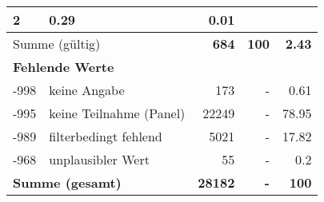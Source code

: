 \begin{longtable}{lXrrr}
       \num{2} &
       \num[round-mode=places,round-precision=2]{0.29} &
         \num[round-mode=places,round-precision=2]{0.01} \\
     \midrule
     \multicolumn{2}{l}{Summe (gültig)} &
       \textbf{\num{684}} &
     \textbf{\num{100}} &
       \textbf{\num[round-mode=places,round-precision=2]{2.43}} \\
     \multicolumn{5}{l}{\textbf{Fehlende Werte}}\\
       -998 &
       keine Angabe &
         \num{173} &
        - &
         \num[round-mode=places,round-precision=2]{0.61} \\
       -995 &
       keine Teilnahme (Panel) &
         \num{22249} &
        - &
         \num[round-mode=places,round-precision=2]{78.95} \\
       -989 &
       filterbedingt fehlend &
         \num{5021} &
        - &
         \num[round-mode=places,round-precision=2]{17.82} \\
       -968 &
       unplausibler Wert &
         \num{55} &
        - &
         \num[round-mode=places,round-precision=2]{0.2} \\
     \midrule
     \multicolumn{2}{l}{\textbf{Summe (gesamt)}} &
          \textbf{\num{28182}} &
        \textbf{-} &
        \textbf{\num{100}} \\
     \bottomrule
     \end{longtable}
     

